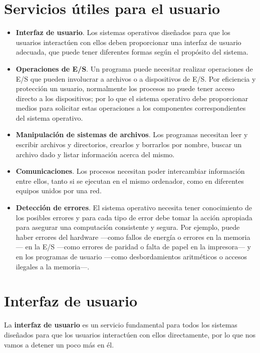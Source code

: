 \section{Servicios útiles para el
usuario}\label{_servicios_uxfatiles_para_el_usuario}

\begin{itemize}
\item
  \textbf{Interfaz de usuario}. Los sistemas operativos diseñados para
  que los usuarios interactúen con ellos deben proporcionar una interfaz
  de usuario adecuada, que puede tener diferentes formas según el
  propósito del sistema.
\item
  \textbf{Operaciones de E/S}. Un programa puede necesitar realizar
  operaciones de E/S que pueden involucrar a archivos o a dispositivos
  de E/S. Por eficiencia y protección un usuario, normalmente los
  procesos no puede tener acceso directo a los dispositivos; por lo que
  el sistema operativo debe proporcionar medios para solicitar estas
  operaciones a los componentes correspondientes del sistema operativo.
\item
  \textbf{Manipulación de sistemas de archivos}. Los programas necesitan
  leer y escribir archivos y directorios, crearlos y borrarlos por
  nombre, buscar un archivo dado y listar información acerca del mismo.
\item
  \textbf{Comunicaciones}. Los procesos necesitan poder intercambiar
  información entre ellos, tanto si se ejecutan en el mismo ordenador,
  como en diferentes equipos unidos por una red.
\item
  \textbf{Detección de errores}. El sistema operativo necesita tener
  conocimiento de los posibles errores y para cada tipo de error debe
  tomar la acción apropiada para asegurar una computación consistente y
  segura. Por ejemplo, puede haber errores del hardware ---como fallos
  de energía o errores en la memoria--- en la E/S ---como errores de
  paridad o falta de papel en la impresora--- y en los programas de
  usuario ---como desbordamientos aritméticos o accesos ilegales a la
  memoria---.
\end{itemize}

\section{Interfaz de usuario}\label{_interfaz_de_usuario}

{} La \textbf{interfaz de usuario} es un servicio fundamental para todos
los sistemas diseñados para que los usuarios interactúen con ellos
directamente, por lo que nos vamos a detener un poco más en él.

